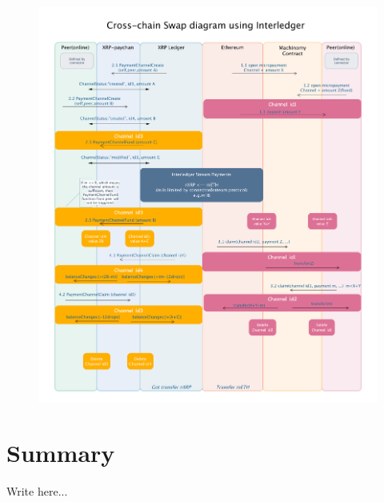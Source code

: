 \begin{figure}[H]
	\includegraphics[width=1\textwidth]{./figures/ETH->XRP}
        \centering
        \caption{}
        \centering
        \label{fig:etox}

\end{figure}
\section{Summary}

Write here...
